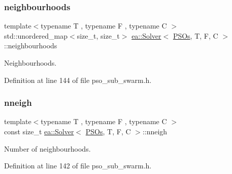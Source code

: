 \subsubsection{\texorpdfstring{neighbourhoods}{neighbourhoods}}
{\footnotesize\ttfamily template$<$typename T , typename F , typename C $>$ \\
std\+::unordered\+\_\+map$<$size\+\_\+t, size\+\_\+t$>$ \hyperlink{classea_1_1_solver}{ea\+::\+Solver}$<$ \hyperlink{structea_1_1_p_s_os}{P\+S\+Os}, T, F, C $>$\+::neighbourhoods\hspace{0.3cm}{\ttfamily [private]}}



Neighbourhoods. 



Definition at line 144 of file pso\+\_\+sub\+\_\+swarm.\+h.

\mbox{\label{classea_1_1_solver_3_01_p_s_os_00_01_t_00_01_f_00_01_c_01_4_a92980b9d3411dd8855a6a050722ebcf7}} 
\subsubsection{\texorpdfstring{nneigh}{nneigh}}
{\footnotesize\ttfamily template$<$typename T , typename F , typename C $>$ \\
const size\+\_\+t \hyperlink{classea_1_1_solver}{ea\+::\+Solver}$<$ \hyperlink{structea_1_1_p_s_os}{P\+S\+Os}, T, F, C $>$\+::nneigh\hspace{0.3cm}{\ttfamily [private]}}



Number of neighbourhoods. 



Definition at line 142 of file pso\+\_\+sub\+\_\+swarm.\+h.

\mbox{\label{classea_1_1_solver_3_01_p_s_os_00_01_t_00_01_f_00_01_c_01_4_a8a857e38363bd1ed23ea77e262b9b710}} 
